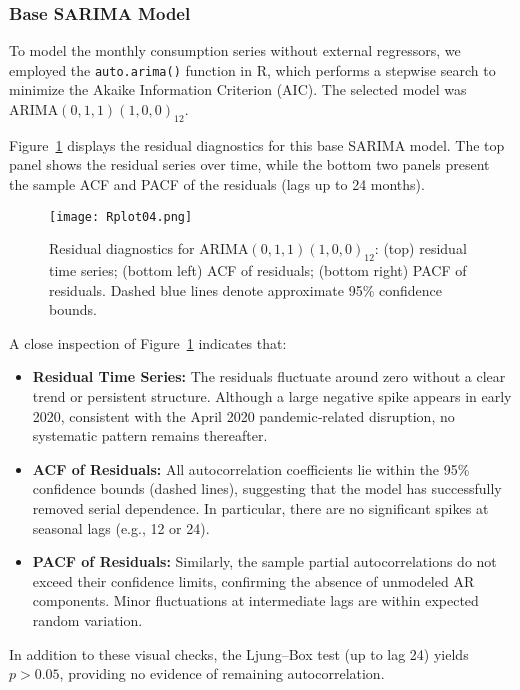 \documentclass[10pt]{article}
\begin{document}
\subsubsection{Base SARIMA Model}

To model the monthly consumption series without external regressors, we employed the \texttt{auto.arima()} function in R, which performs a stepwise search to minimize the Akaike Information Criterion (AIC).  The selected model was $\text{ARIMA}(0,1,1)(1,0,0)_{12}$.

Figure~\ref{fig:sarima} displays the residual diagnostics for this base SARIMA model.  The top panel shows the residual series over time, while the bottom two panels present the sample ACF and PACF of the residuals (lags up to 24 months). 

\begin{figure}[ht]
\centering
\texttt{[image: Rplot04.png]}
\caption{Residual diagnostics for $\text{ARIMA}(0,1,1)(1,0,0)_{12}$: (top) residual time series; (bottom left) ACF of residuals; (bottom right) PACF of residuals.  Dashed blue lines denote approximate 95\% confidence bounds.}
\label{fig:sarima}
\end{figure}

A close inspection of Figure~\ref{fig:sarima} indicates that:
\begin{itemize}
  \item \textbf{Residual Time Series:} The residuals fluctuate around zero without a clear trend or persistent structure.  Although a large negative spike appears in early 2020, consistent with the April 2020 pandemic‐related disruption, no systematic pattern remains thereafter.
  \item \textbf{ACF of Residuals:} All autocorrelation coefficients lie within the 95\% confidence bounds (dashed lines), suggesting that the model has successfully removed serial dependence.  In particular, there are no significant spikes at seasonal lags (e.g., 12 or 24).
  \item \textbf{PACF of Residuals:} Similarly, the sample partial autocorrelations do not exceed their confidence limits, confirming the absence of unmodeled AR components.  Minor fluctuations at intermediate lags are within expected random variation.
\end{itemize}

In addition to these visual checks, the Ljung–Box test (up to lag 24) yields $p>0.05$, providing no evidence of remaining autocorrelation.  
\end{document}
